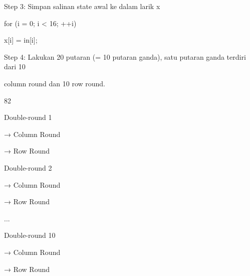 \documentclass{article}
\begin{document}

Step 3: Simpan salinan state awal ke dalam larik x 

               for (i = 0; i < 16; ++i)



x[i] = in[i];

Step 4: Lakukan 20 putaran (= 10 putaran ganda), satu putaran ganda terdiri dari 10 

column round dan 10 row round. 

82

Double-round 1

   → Column Round

   → Row Round

Double-round 2

   → Column Round

   → Row Round

...


Double-round 10

   → Column Round

   → Row Round
\end{document}
